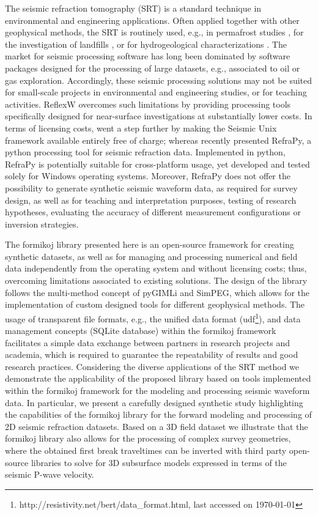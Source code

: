 \documentclass[a4paper,fleqn]{cas-sc}
\begin{document}
The seismic refraction tomography (SRT) is a standard technique in environmental and engineering applications. Often applied together with other geophysical methods, the SRT is routinely used, e.g., in permafrost studies \citep[e.g.,][]{draebing2016, steiner2021}, for the investigation of landfills \citep[e.g.,][]{nguyen2018, steiner2022}, or for hydrogeological characterizations \citep[e.g.,][]{buecker2021}. 
The market for seismic processing software has long been dominated by software packages designed for the processing of large datasets, e.g., associated to oil or gas exploration. 
Accordingly, these seismic processing solutions may not be suited for small-scale projects in environmental and engineering studies, or for teaching activities. 
ReflexW overcomes such limitations by providing processing tools specifically designed for near-surface investigations at substantially lower costs. In terms of licensing costs, \citet{stockwell1999} went a step further by making the Seismic Unix framework available entirely free of charge; whereas \citet{guedes2022} recently presented RefraPy, a python processing tool for seismic refraction data. 
Implemented in python, RefraPy is potentially suitable for cross-platform usage, yet \citet{guedes2022} developed and tested solely for Windows operating systems. Moreover, RefraPy does not offer the possibility to generate synthetic seismic waveform data, as required for survey design, as well as for teaching and interpretation purposes, testing of research hypotheses, evaluating the accuracy of different measurement configurations or inversion strategies.

The formikoj library presented here is an open-source framework for creating synthetic datasets, as well as for managing and processing numerical and field data independently from the operating system and without licensing costs; thus, overcoming limitations associated to existing solutions. The design of the library follows the multi-method concept of pyGIMLi and SimPEG, which allows for the implementation of custom designed tools for different geophysical methods. 
The usage of transparent file formats, e.g., the unified data format (udf\footnote{http://resistivity.net/bert/data\_format.html, last accessed on \today}), and data management concepts (SQLite database) within the formikoj framework facilitates a simple data exchange between partners in research projects and academia, which is required to guarantee the repeatability of results and good research practices.
Considering the diverse applications of the SRT method we demonstrate the applicability of the proposed library based on tools implemented within the formikoj framework for the modeling and processing seismic waveform data. In particular, we present a carefully designed synthetic study highlighting the capabilities of the formikoj library for the forward modeling and processing of 2D seismic refraction datasets. Based on a 3D field dataset we illustrate that the formikoj library also allows for the processing of complex survey geometries, where the obtained first break traveltimes can be inverted with third party open-source libraries to solve for 3D subsurface models expressed in terms of the seismic P-wave velocity.
\end{document}
